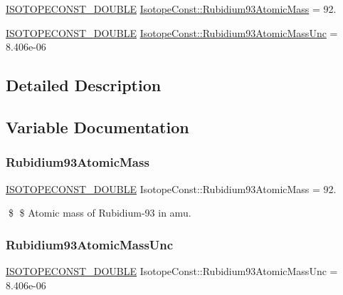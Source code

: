 \begin{DoxyCompactItemize}
\item 
\mbox{\hyperlink{group___isotope_const-_macros_ga8f45a7272ce02c0b4c65c44636ed719a}{I\+S\+O\+T\+O\+P\+E\+C\+O\+N\+S\+T\+\_\+\+D\+O\+U\+B\+LE}} \mbox{\hyperlink{group___isotope_const-_rubidium-_rb93_gaa8c20752d7408a8c1cd0d3d7f83f6f64}{Isotope\+Const\+::\+Rubidium93\+Atomic\+Mass}} = 92.
\item 
\mbox{\hyperlink{group___isotope_const-_macros_ga8f45a7272ce02c0b4c65c44636ed719a}{I\+S\+O\+T\+O\+P\+E\+C\+O\+N\+S\+T\+\_\+\+D\+O\+U\+B\+LE}} \mbox{\hyperlink{group___isotope_const-_rubidium-_rb93_gaaf0604abdf90afb36af0ad926738112f}{Isotope\+Const\+::\+Rubidium93\+Atomic\+Mass\+Unc}} = 8.\+406e-\/06
\end{DoxyCompactItemize}


\subsection{Detailed Description}


\subsection{Variable Documentation}
\mbox{\label{group___isotope_const-_rubidium-_rb93_gaa8c20752d7408a8c1cd0d3d7f83f6f64}} 
\subsubsection{\texorpdfstring{Rubidium93\+Atomic\+Mass}{Rubidium93AtomicMass}}
{\footnotesize\ttfamily \mbox{\hyperlink{group___isotope_const-_macros_ga8f45a7272ce02c0b4c65c44636ed719a}{I\+S\+O\+T\+O\+P\+E\+C\+O\+N\+S\+T\+\_\+\+D\+O\+U\+B\+LE}} Isotope\+Const\+::\+Rubidium93\+Atomic\+Mass = 92.}

\$ \$ Atomic mass of Rubidium-\/93 in amu. \mbox{\label{group___isotope_const-_rubidium-_rb93_gaaf0604abdf90afb36af0ad926738112f}} 
\subsubsection{\texorpdfstring{Rubidium93\+Atomic\+Mass\+Unc}{Rubidium93AtomicMassUnc}}
{\footnotesize\ttfamily \mbox{\hyperlink{group___isotope_const-_macros_ga8f45a7272ce02c0b4c65c44636ed719a}{I\+S\+O\+T\+O\+P\+E\+C\+O\+N\+S\+T\+\_\+\+D\+O\+U\+B\+LE}} Isotope\+Const\+::\+Rubidium93\+Atomic\+Mass\+Unc = 8.\+406e-\/06}

